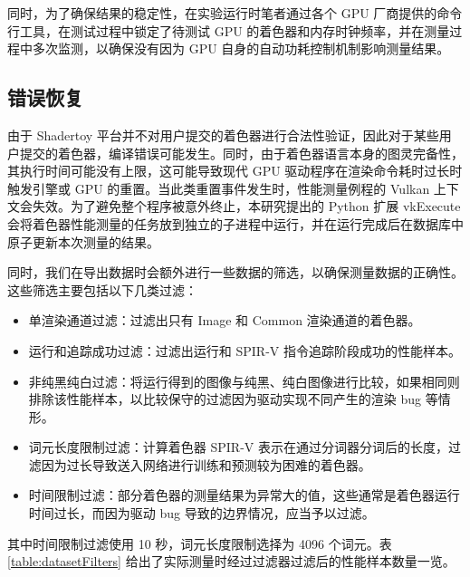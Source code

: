 同时，为了确保结果的稳定性，在实验运行时笔者通过各个 GPU 厂商提供的命令行工具，在测试过程中锁定了待测试 GPU 的着色器和内存时钟频率，并在测量过程中多次监测，以确保没有因为 GPU 自身的自动功耗控制机制影响测量结果。

\subsection{错误恢复}

\label{sec:error_recovery_and_filters}

由于 Shadertoy 平台并不对用户提交的着色器进行合法性验证，因此对于某些用户提交的着色器，编译错误可能发生。同时，由于着色器语言本身的图灵完备性，其执行时间可能没有上限，这可能导致现代 GPU 驱动程序在渲染命令耗时过长时触发引擎或 GPU 的重置\cite{TDRWindows}。当此类重置事件发生时，性能测量例程的 Vulkan 上下文会失效。为了避免整个程序被意外终止，本研究提出的 Python 扩展 vkExecute 会将着色器性能测量的任务放到独立的子进程中运行，并在运行完成后在数据库中原子更新本次测量的结果。

同时，我们在导出数据时会额外进行一些数据的筛选，以确保测量数据的正确性。这些筛选主要包括以下几类过滤：
\begin{itemize}
    \item 单渲染通道过滤：过滤出只有 Image 和 Common 渲染通道的着色器。
    \item 运行和追踪成功过滤：过滤出运行和 SPIR-V 指令追踪阶段成功的性能样本。
    \item 非纯黑纯白过滤：将运行得到的图像与纯黑、纯白图像进行比较，如果相同则排除该性能样本，以比较保守的过滤因为驱动实现不同产生的渲染 bug 等情形。
    \item 词元长度限制过滤：计算着色器 SPIR-V 表示在通过分词器分词后的长度，过滤因为过长导致送入网络进行训练和预测较为困难的着色器。
    \item 时间限制过滤：部分着色器的测量结果为异常大的值，这些通常是着色器运行时间过长，而因为驱动 bug 导致的边界情况，应当予以过滤。
\end{itemize}

其中时间限制过滤使用 10 秒，词元长度限制选择为 4096 个词元。表 \ref{table:datasetFilters} 给出了实际测量时经过过滤器过滤后的性能样本数量一览。

